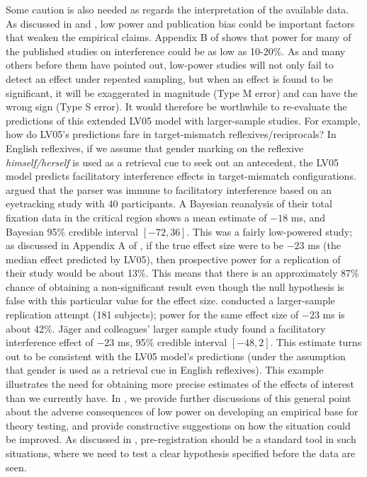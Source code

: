 \documentclass{cambridge7A}\usepackage[]{graphicx}\usepackage[]{color}
\begin{document}
Some caution is also needed as regards the interpretation of the available data. As discussed in \cite{JaegerEngelmannVasishth2017} and \cite{VasishthMertzenJaegerGelman2018}, low power and publication bias could be important factors that weaken the empirical claims. Appendix B of \cite{JaegerEngelmannVasishth2017} shows that power for many of the published studies on interference could be as low as 10-20\%. As \cite{GelmanCarlin2014} and many others before them have pointed out, low-power studies will not only fail to detect an effect under repeated sampling, but when an effect is found to be significant, it will be exaggerated in magnitude (Type M error) and can have the wrong sign (Type S error). It would therefore be worthwhile to re-evaluate the predictions of this extended LV05 model with larger-sample studies. For example, how do LV05's predictions fare in target-mismatch reflexives/reciprocals? In  English reflexives, if we assume that gender marking on the reflexive \textit{himself/herself} is used as a retrieval cue to seek out an antecedent, the LV05 model predicts facilitatory interference effects in target-mismatch configurations. 
\cite{DillonMishlerSloggett2013} argued that the parser was immune to facilitatory interference based on an eyetracking study with 40 participants. A Bayesian reanalysis of their total fixation data in the critical region \citep{JaegerMertzenVanDykeVasishth2019} shows a mean estimate of $-18$ ms, and Bayesian 95\% credible interval $[-72,36]$. This was a fairly low-powered study; as discussed in Appendix A of  \cite{JaegerMertzenVanDykeVasishth2019}, if the true effect size were to be $-23$ ms (the median effect predicted by LV05), then prospective power for a replication of their study would be about 13\%. This means that there is an approximately 87\% chance of obtaining a non-significant result even though the null hypothesis is false with this particular value for the effect size.
\cite{JaegerMertzenVanDykeVasishth2019} conducted a larger-sample replication attempt (181 subjects); power for the same effect size of $-23$ ms is about 42\%.
J\"ager and colleagues' larger sample study found a facilitatory interference effect of $-23$ ms, 95\% credible interval $[-48,2]$. This estimate turns out to be consistent with the LV05 model's predictions (under the assumption that gender is used as a retrieval cue in English reflexives). This example illustrates the need for obtaining more precise estimates of the effects of interest than we currently have. In \cite{VasishthMertzenJaegerGelman2018}, we provide further discussions of this general point about the adverse consequences of low power on developing an empirical base for theory testing, and provide constructive suggestions on how the situation could be improved. As discussed in \cite{chambers2019seven}, pre-registration should be a standard tool in such situations, where we need to test a clear hypothesis specified before the data are seen. 
\end{document}
